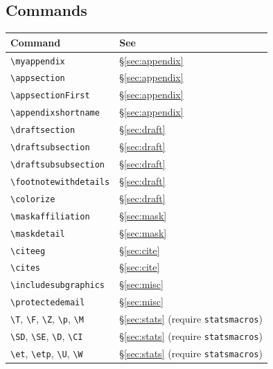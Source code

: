 \documentclass[a4paper,11pt]{article}
\newcommand{\cmd}[1]{\texttt{\textbackslash #1}}
\newcommand{\opt}[1]{\texttt{#1}}
\begin{document}
\subsection*{Commands}
\begin{center}
\begin{tabular}{ll}
\toprule
Command & See \\
\midrule
\cmd{myappendix}           & \S\ref{sec:appendix} \\
\cmd{appsection}           & \S\ref{sec:appendix} \\
\cmd{appsectionFirst}      & \S\ref{sec:appendix} \\
\cmd{appendixshortname}    & \S\ref{sec:appendix} \\
\cmd{draftsection}         & \S\ref{sec:draft} \\
\cmd{draftsubsection}      & \S\ref{sec:draft} \\
\cmd{draftsubsubsection}   & \S\ref{sec:draft} \\
\cmd{footnotewithdetails}  & \S\ref{sec:draft} \\
\cmd{colorize}             & \S\ref{sec:draft} \\
\cmd{maskaffiliation}      & \S\ref{sec:mask} \\
\cmd{maskdetail}           & \S\ref{sec:mask} \\
\cmd{citeeg}               & \S\ref{sec:cite} \\
\cmd{cites}                & \S\ref{sec:cite} \\
\cmd{includesubgraphics}   & \S\ref{sec:misc} \\
\cmd{protectedemail}       & \S\ref{sec:misc} \\
\cmd{T}, \cmd{F}, \cmd{Z}, \cmd{p}, \cmd{M} & \S\ref{sec:stats} (require \opt{statsmacros}) \\
\cmd{SD}, \cmd{SE}, \cmd{D}, \cmd{CI}        & \S\ref{sec:stats} (require \opt{statsmacros}) \\
\cmd{et}, \cmd{etp}, \cmd{U}, \cmd{W}        & \S\ref{sec:stats} (require \opt{statsmacros}) \\
\bottomrule
\end{tabular}
\end{center}

\printindex
\end{document}
